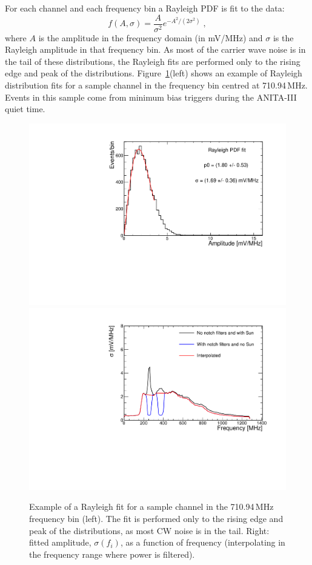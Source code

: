 For each channel and each frequency bin a Rayleigh PDF is fit to the data:
\begin{equation} 
  f(A, \sigma)=\dfrac{A}{\sigma^2}e^{-A^2/(2\sigma^2)} \;,
  \label{eq:rayleigh}
\end{equation}
\noindent where $A$ is the amplitude in the frequency domain (in mV/MHz) and $\sigma$ is the
Rayleigh amplitude in that frequency bin.
As most of the carrier wave noise is in the tail of these
distributions, the Rayleigh fits are performed only to the rising edge and peak of the distributions.
Figure~\ref{fig:rayleighFits}(left) shows an example of Rayleigh distribution fits for a sample channel in the frequency bin centred at 710.94\,MHz.
Events in this sample come from minimum bias triggers during the ANITA-III quiet time.
 
\begin{figure}[!h]\centering
  \includegraphics[width=.45\linewidth]{./Figs/RayleighExample.pdf}
  \includegraphics[width=.45\linewidth]{./Figs/RayleighSigma_1V_old.pdf}
  \caption{Example of a Rayleigh fit for a sample channel in the
    710.94\,MHz frequency bin (left). The fit is performed only to the rising edge and peak of the distributions, as most CW noise is in the tail. 
Right: fitted amplitude, $\sigma(f_i)$, as a
    function of frequency (interpolating in the frequency range where power is filtered). }
  \label{fig:rayleighFits}
\end{figure}

